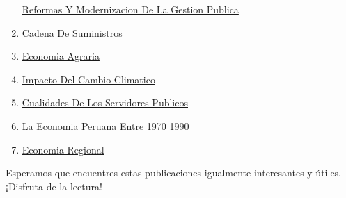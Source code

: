\documentclass[
  jou,
  floatsintext,
  longtable,
  a4paper,
  nolmodern,
  notxfonts,
  notimes,
  colorlinks=true,linkcolor=blue,citecolor=blue,urlcolor=blue]{apa7}
\begin{document}
\begin{enumerate}
  \href{https://achalmaedison.netlify.app/blog/posts/2021-10-01-reformas-y-modernizacion-de-la-gestion-publica}{Reformas
  Y Modernizacion De La Gestion Publica}
\item
  \href{https://achalmaedison.netlify.app/blog/posts/2022-01-23-cadena\%20de\%20suministros/index.pdf}{}
  \href{https://achalmaedison.netlify.app/blog/posts/2022-01-23-cadena\%20de\%20suministros}{Cadena
  De Suministros}
\item
  \href{https://achalmaedison.netlify.app/blog/posts/2022-04-22-economia-agraria/index.pdf}{}
  \href{https://achalmaedison.netlify.app/blog/posts/2022-04-22-economia-agraria}{Economia
  Agraria}
\item
  \href{https://achalmaedison.netlify.app/blog/posts/2022-06-02-impacto-del-cambio-climatico/index.pdf}{}
  \href{https://achalmaedison.netlify.app/blog/posts/2022-06-02-impacto-del-cambio-climatico}{Impacto
  Del Cambio Climatico}
\item
  \href{https://achalmaedison.netlify.app/blog/posts/2023-05-11-cualidades-de-los-servidores-publicos/index.pdf}{}
  \href{https://achalmaedison.netlify.app/blog/posts/2023-05-11-cualidades-de-los-servidores-publicos}{Cualidades
  De Los Servidores Publicos}
\item
  \href{https://achalmaedison.netlify.app/blog/posts/2023-05-12-la-economia-peruana-entre-1970-1990/index.pdf}{}
  \href{https://achalmaedison.netlify.app/blog/posts/2023-05-12-la-economia-peruana-entre-1970-1990}{La
  Economia Peruana Entre 1970 1990}
\item
  \href{https://achalmaedison.netlify.app/blog/posts/2023-05-16-economia-regional/index.pdf}{}
  \href{https://achalmaedison.netlify.app/blog/posts/2023-05-16-economia-regional}{Economia
  Regional}
\end{enumerate}

Esperamos que encuentres estas publicaciones igualmente interesantes y
útiles. ¡Disfruta de la lectura!
\end{document}
